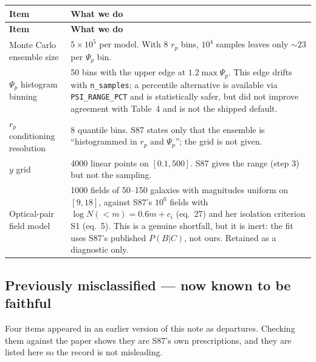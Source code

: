 \documentclass[11pt]{article}
\begin{document}
\begin{longtable}{p{} p{}}
\toprule
\textbf{Item} & \textbf{What we do} \\
\midrule
\endfirsthead
\toprule
\textbf{Item} & \textbf{What we do} \\
\midrule
\endhead
\bottomrule
\endfoot

Monte Carlo ensemble size &
$5\times10^5$ per model. With 8 $r_p$ bins, $10^4$ samples leaves only
${\sim}23$ per $\Psi_p$ bin. \\[4pt]

$\Psi_p$ histogram binning &
50 bins with the upper edge at $1.2\max\Psi_p$. This edge drifts with
\texttt{n\_samples}; a percentile alternative is available via
\texttt{PSI\_RANGE\_PCT} and is statistically safer, but did not improve
agreement with Table~4 and is not the shipped default. \\[4pt]

$r_p$ conditioning resolution &
8 quantile bins. S87 states only that the ensemble is ``histogrammed in $r_p$
and $\Psi_p$''; the grid is not given. \\[4pt]

$y$ grid &
4000 linear points on $[0.1,500]$. S87 gives the range (step 3) but not the
sampling. \\[4pt]

Optical-pair field model &
1000 fields of 50--150 galaxies with magnitudes uniform on $[9,18]$, against
S87's $10^6$ fields with $\log N(<m) = 0.6m + c_i$ (eq.~27) and her isolation
criterion S1 (eq.~5). This is a genuine shortfall, but it is inert: the fit
uses S87's published $P(B|C)$, not ours. Retained as a diagnostic only. \\
\end{longtable}

\subsection{Previously misclassified --- now known to be faithful}

Four items appeared in an earlier version of this note as departures. Checking
them against the paper shows they are S87's own prescriptions, and they are
listed here so the record is not misleading.
\end{document}
